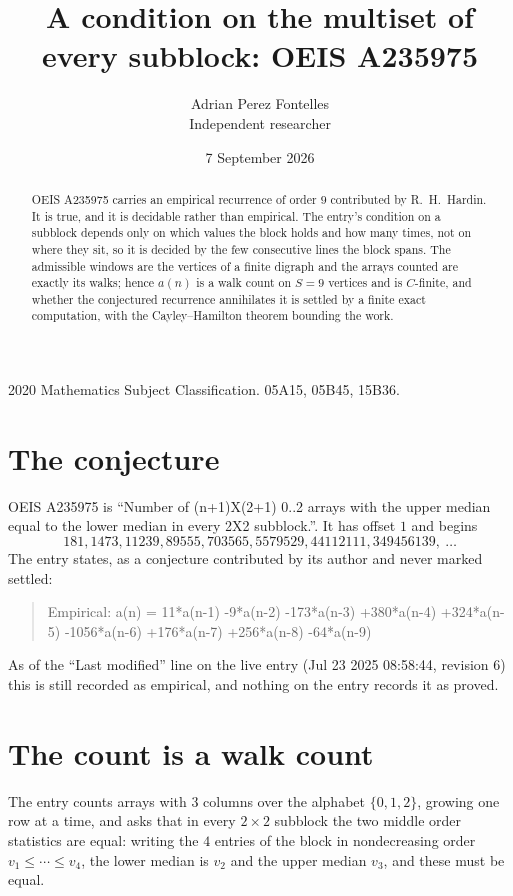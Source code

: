 \documentclass[11pt,a4paper]{article}
\title{A condition on the multiset of every subblock: OEIS A235975}
\author{Adrian Perez Fontelles\\ \small Independent researcher}
\date{7 September 2026}
\theoremstyle{plain}
\theoremstyle{definition}
\begin{document}
\maketitle

\begin{abstract}
OEIS A235975 carries an empirical recurrence of order $9$ contributed by R.~H.~Hardin. It is
true, and it is decidable rather than empirical. The entry's condition on a subblock depends
only on which values the block holds and how many times, not on where they sit, so it is
decided by the few consecutive lines the block spans. The admissible windows are the vertices
of a finite digraph and the arrays counted are exactly its walks; hence $a(n)$ is a walk count
on $S=9$ vertices and is $C$-finite, and whether the conjectured recurrence annihilates it
is settled by a finite exact computation, with the Cayley--Hamilton theorem bounding the
work.
\end{abstract}

\noindent\small 2020 Mathematics Subject Classification. 05A15, 05B45, 15B36.\normalsize

\section{The conjecture}

OEIS A235975 is ``Number of (n+1)X(2+1) 0..2 arrays with the upper median equal to the lower median in every 2X2 subblock.''. It has offset $1$ and begins
\[
181, 1473, 11239, 89555, 703565, 5579529, 44112111, 349456139,\ \dots
\]
The entry states, as a conjecture contributed by its author and never marked settled:
\begin{quote}
Empirical: a(n) = 11*a(n-1) -9*a(n-2) -173*a(n-3) +380*a(n-4) +324*a(n-5) -1056*a(n-6) +176*a(n-7) +256*a(n-8) -64*a(n-9)
\end{quote}
As of the ``Last modified'' line on the live entry (Jul 23 2025 08:58:44, revision 6) this is still
recorded as empirical, and nothing on the entry records it as proved.

\section{The count is a walk count}

The entry counts arrays with $3$ columns over the alphabet $\{0,1,2\}$, growing one row at a time, and asks that in every $2\times2$ subblock the two middle order statistics are equal: writing the $4$ entries of the block in nondecreasing order $v_1\le\cdots\le v_{4}$, the lower median is $v_{2}$ and the upper median $v_{3}$, and these must be equal.
\end{document}
